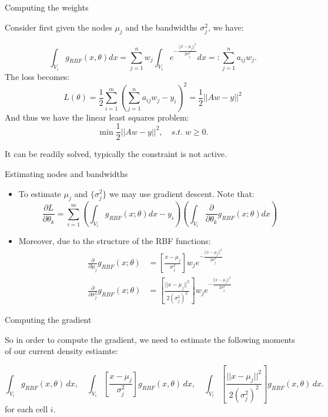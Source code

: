 \documentclass[aspectratio=169]{beamer}
\begin{document}
\begin{frame}{Computing the weights}

	Consider first given the nodes $\mu_j$ and the bandwidths $\sigma_j^2$, we have:

	\begin{equation*}
		\int_{V_i} g_{RBF}(x,\theta)dx = \sum_{j=1}^n w_j \int_{V_i} e^{-\frac{||x-\mu_j||^2}{2\sigma_j^2}} dx =: \sum_{j=1}^n a_{ij}w_j.
	\end{equation*}
	The loss becomes:
	\begin{equation*}
		L(\theta) = \frac{1}{2}\sum_{i=1}^m \left(\sum_{j=1}^n a_{ij}w_j - y_i\right)^2 = \frac{1}{2}||Aw-y||^2
	\end{equation*}
	And thus we have the linear least squares problem:
	\begin{equation*}
		\min \frac{1}{2}||Aw-y||^2, \quad s.t. \; w\geqslant 0.
	\end{equation*}

	It can be readily solved, typically the constraint is not active.
\end{frame}

\begin{frame}{Estimating nodes and bandwidths}

	\begin{itemize}
		\item To estimate ${\mu_j}$ and $\{\sigma_j^2\}$ we may use \alert{gradient descent}. Note that:
		\begin{equation*}
			\frac{\partial L}{\partial \theta_k} = \sum_{i=1}^m \left(\int_{V_i} g_{RBF}(x;\theta) dx - y_i\right) \left(\int_{V_i} \frac{\partial}{\partial \theta_k}g_{RBF}(x;\theta) dx\right)
		\end{equation*}
		\vfill
		\item Moreover, due to the structure of the RBF functions:
		\begin{eqnarray*}
			\frac{\partial}{\partial \mu_j}g_{RBF}(x;\theta) &= \left[\frac{x-\mu_j}{\sigma_j^2}\right] w_j e^{-\frac{||x-\mu_j||^2}{2\sigma_j^2}} \\
			\frac{\partial}{\partial \sigma_j^2}g_{RBF}(x;\theta) &= \left[\frac{||x-\mu_j||^2}{2(\sigma_j^2)^2}\right] w_je^{-\frac{||x-\mu_j||^2}{2\sigma_j^2}}
		\end{eqnarray*}
	\end{itemize}		


\end{frame}
	

\begin{frame}{Computing the gradient}


So in order to compute the gradient, we need to estimate the following \alert{moments} of our current density estiamte:

\begin{equation*}
	\int_{V_i} g_{RBF}(x,\theta) \, dx, \quad \int_{V_i} \left[\frac{x-\mu_j}{\sigma_j^2}\right] g_{RBF}(x,\theta) \,dx, \quad \int_{V_i} \left[\frac{||x-\mu_j||^2}{2(\sigma_j^2)^2}\right] g_{RBF}(x,\theta) \,dx.
\end{equation*}
for each cell $i$.
\end{frame}
\end{document}

